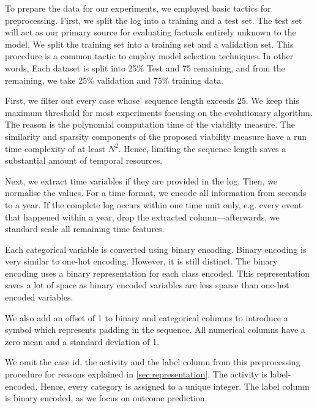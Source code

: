 \documentclass[./../../paper.tex]{subfiles}
\begin{document}
To prepare the data for our experiments, we employed basic tactics for preprocessing. First, we split the log into a training and a test set. The test set will act as our primary source for evaluating factuals entirely unknown to the model. We split the training set into a training set and a validation set. This procedure is a common tactic to employ model selection techniques. In other words, Each dataset is split into 25\% Test and 75 remaining, and from the remaining, we take 25\% validation and 75\% training data.

First, we filter out every case whose' sequence length exceeds 25. We keep this maximum threshold for most experiments focusing on the evolutionary algorithm. The reason is the polynomial computation time of the viability measure. The similarity and sparsity components of the proposed viability measure have a run time complexity of at least $N^2$. Hence, limiting the sequence length saves a substantial amount of temporal resources.

Next, we extract time variables if they are provided in the log. Then, we normalise the values. For a time format, we encode all information from seconds to a year. If the complete log occurs within one time unit only, e.g. every event that happened within a year, drop the extracted column—afterwards, we standard scale all remaining time features.

Each categorical variable is converted using binary encoding. Binary encoding is very similar to one-hot encoding. However, it is still distinct. The binary encoding uses a binary representation for each class encoded. This representation saves a lot of space as binary encoded variables are less sparse than one-hot encoded variables.


We also add an offset of 1 to binary and categorical columns to introduce a symbol which represents padding in the sequence. All numerical columns have a zero mean and a standard deviation of 1.

We omit the case id, the activity and the label column from this preprocessing procedure for reasons explained in \autoref{sec:representation}. The activity is label-encoded. Hence, every category is assigned to a unique integer. The label column is binary encoded, as we focus on outcome prediction.


  
\end{document}
